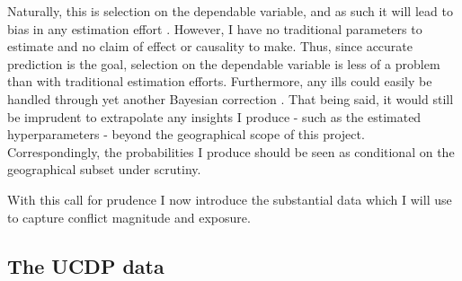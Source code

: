 \documentclass[a4paper]{article}
\begin{document}
Naturally, this is selection on the dependable variable, and as such it will lead to bias in any estimation effort \citep[129-130]{king1994designing}. However, I have no traditional parameters to estimate and no claim of effect or causality to make. Thus, since accurate prediction is the goal, selection on the dependable variable is less of a problem than with traditional estimation efforts. Furthermore, any ills could easily be handled through yet another Bayesian correction \citep[627-628]{King_Zeng_2001}. That being said, it would still be imprudent to extrapolate any insights I produce - such as the estimated hyperparameters - beyond the geographical scope of this project. Correspondingly, the probabilities I produce should be seen as conditional on the geographical subset under scrutiny.\par



With this call for prudence I now introduce the substantial data which I will use to capture conflict magnitude and exposure.\par

\subsection{The UCDP data}



\end{document}
